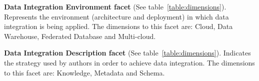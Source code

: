 \textbf{Data Integration Environment facet} (See table~\ref{table:dimensions}). 
Represents the environment (architecture and deployment) in which data integration is being applied.
The dimensions to this facet are: Cloud, Data Warehouse, Federated Database and Multi-cloud.

\textbf{Data Integration Description facet} (See table~\ref{table:dimensions}).
Indicates the strategy used by authors in order to achieve data integration. 
The dimensions to this facet are: Knowledge, Metadata and Schema.

